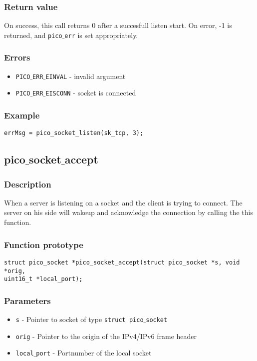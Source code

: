 \subsubsection*{Return value}
On success, this call returns 0 after a succesfull listen start.
On error, -1 is returned, and \texttt{pico$\_$err} is set appropriately. 

\subsubsection*{Errors}
\begin{itemize}[noitemsep]
\item \texttt{PICO$\_$ERR$\_$EINVAL} - invalid argument
\item \texttt{PICO$\_$ERR$\_$EISCONN} - socket is connected
\end{itemize}

\subsubsection*{Example}
\begin{verbatim}
errMsg = pico_socket_listen(sk_tcp, 3);
\end{verbatim}


\subsection{pico$\_$socket$\_$accept}

\subsubsection*{Description}
When a server is listening on a socket and the client is trying to connect.
The server on his side will wakeup and acknowledge the connection by calling the this function.

\subsubsection*{Function prototype}
\begin{verbatim}
struct pico_socket *pico_socket_accept(struct pico_socket *s, void *orig,
uint16_t *local_port);
\end{verbatim}


\subsubsection*{Parameters}
\begin{itemize}[noitemsep]
\item \texttt{s} - Pointer to socket of type \texttt{struct pico$\_$socket}
\item \texttt{orig} - Pointer to the origin of the IPv4/IPv6 frame header
\item \texttt{local$\_$port} - Portnumber of the local socket
\end{itemize}

